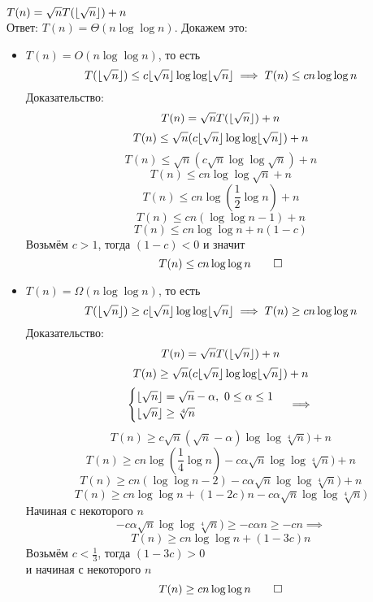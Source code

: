 \documentclass[12pt]{article}
\DeclarePairedDelimiter\floor{\lfloor}{\rfloor}
\newcommand{\sqrtn}{\sqrt n}
\newcommand{\fsqrtn}{\floor{\sqrtn}}
\newcommand{\Tfsqrtn}{T(\fsqrtn)}
\newcommand{\logn}[1][n]{\log #1}
\newcommand{\loglogn}[1][n]{\log\log #1}
\newcommand{\nloglogn}[1][n]{#1\log\log #1}
\begin{document}
	\Large
	\noindent
	$T(n) = \sqrtn\Tfsqrtn + n$\\
	Ответ: $T(n) = \Theta(\nloglogn)$. Докажем это:
	\begin{itemize}
		\item
			$T(n) = O(\nloglogn)$, то есть\\
			$$\Tfsqrtn \le c\nloglogn[\fsqrtn] \implies T(n) \le c\nloglogn$$
			Доказательство:
			$$T(n) = \sqrtn\Tfsqrtn + n$$
			$$T(n) \le \sqrtn(c\nloglogn[\fsqrtn]) + n$$
			$$T(n) \le \sqrtn(c\nloglogn[\sqrtn]) + n$$
			$$T(n) \le cn\loglogn[\sqrtn] + n$$
			$$T(n) \le cn\log(\frac{1}{2}\logn) + n$$
			$$T(n) \le cn(\loglogn - 1) + n$$
			$$T(n) \le c\nloglogn + n(1-c)$$
			Возьмём $c > 1$, тогда $(1 - c) < 0$ и значит\\
			$$T(n) \le c\nloglogn \qed$$
			\newpage
		\item
			$T(n) = \Omega(\nloglogn)$, то есть\\
			$$\Tfsqrtn \ge c\nloglogn[\fsqrtn] \implies T(n) \ge c\nloglogn$$
			Доказательство:
			$$T(n) = \sqrtn\Tfsqrtn + n$$
			$$T(n) \ge \sqrtn(c\nloglogn[\fsqrtn]) + n$$
			$$\begin{cases}
				\fsqrtn = \sqrtn - \alpha,\ 0 \le \alpha \le 1\\
				\fsqrtn \ge \sqrt[4]{n}
			\end{cases} \implies$$
			$$T(n) \ge c\sqrtn(\sqrtn-\alpha)\loglogn[{\sqrt[4]{n}}]) + n$$
			$$T(n) \ge cn\log(\frac{1}{4}\logn) - c\alpha\sqrtn\loglogn[{\sqrt[4]{n}}]) + n$$
			$$T(n) \ge cn(\loglogn - 2) - c\alpha\sqrtn\loglogn[{\sqrt[4]{n}}]) + n$$
			$$T(n) \ge cn\loglogn + (1 - 2c)n - c\alpha\sqrtn\loglogn[{\sqrt[4]{n}}])$$
			Начиная с некоторого $n$
			$$-c\alpha\sqrtn\loglogn[{\sqrt[4]{n}}]) \ge -c\alpha n \ge -cn \implies$$
			$$T(n) \ge cn\loglogn + (1 - 3c)n$$
			Возьмём $c < \frac{1}{3}$, тогда $(1 - 3c) > 0$ \\
			и начиная с некоторого $n$
			$$T(n) \ge c\nloglogn \qed$$
	\end{itemize}
\end{document}

